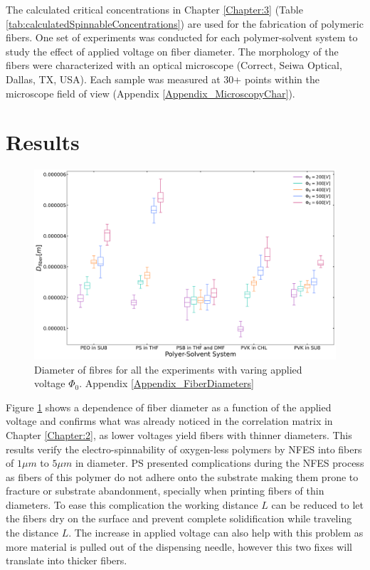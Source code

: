 The calculated critical concentrations in Chapter \ref{Chapter:3} (Table \ref{tab:calculatedSpinnableConcentrations}) are used for the fabrication of polymeric fibers. One set of experiments was conducted for each polymer-solvent system to study the effect of applied voltage on fiber diameter. The morphology of the fibers were characterized with an optical microscope (Correct, Seiwa Optical, Dallas, TX, USA). Each sample was measured at 30+ points within the microscope field of view (Appendix \ref{Appendix_MicroscopyChar}).

\section{Results}

\begin{figure}[!th]
\centering
\includegraphics[width=\textwidth]{./Figures/boxplotsFiberDiameter.png}
\decoRule
\caption[Diameter of fibres for all the experiments]{Diameter of fibres for all the experiments with varing applied voltage $\Phi_0$. Appendix \ref{Appendix_FiberDiameters}}
\label{fig:boxplotsFiberDiameter}
\end{figure}

Figure \ref{fig:boxplotsFiberDiameter} shows a dependence of fiber diameter as a function of the applied voltage and confirms what was already noticed in the correlation matrix in Chapter \ref{Chapter:2}, as lower voltages yield fibers with thinner diameters. This results verify the electro-spinnability of oxygen-less polymers by NFES into fibers of $1 \mu m$ to $5 \mu m$ in diameter. PS presented complications during the NFES process as fibers of this polymer do not adhere onto the substrate making them prone to fracture or substrate abandonment, specially when printing fibers of thin diameters. To ease this complication the working distance $L$ can be reduced to let the fibers dry on the surface and prevent complete solidification while traveling the distance $L$. The increase in applied voltage can also help with this problem as more material is pulled out of the dispensing needle, however this two fixes will translate into thicker fibers.

